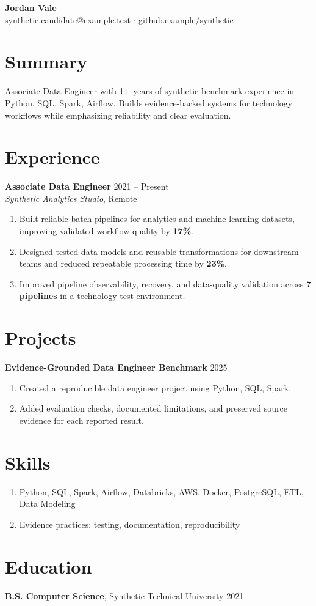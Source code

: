 \documentclass[10pt,letterpaper]{article}
\begin{document}
\begin{center}
{\Large \textbf{Jordan Vale}}\\
synthetic.candidate@example.test $\cdot$ github.example/synthetic
\end{center}

\section*{Summary}
Associate Data Engineer with 1+ years of synthetic benchmark experience in Python, SQL, Spark, Airflow. Builds evidence-backed systems for technology workflows while emphasizing reliability and clear evaluation.

\section*{Experience}
\textbf{Associate Data Engineer} \hfill 2021 -- Present\\
\textit{Synthetic Analytics Studio}, Remote
\begin{enumerate}
  \item Built reliable batch pipelines for analytics and machine learning datasets, improving validated workflow quality by \textbf{17\%}.
  \item Designed tested data models and reusable transformations for downstream teams and reduced repeatable processing time by \textbf{23\%}.
  \item Improved pipeline observability, recovery, and data-quality validation across \textbf{7 pipelines} in a technology test environment.
\end{enumerate}

\section*{Projects}
\textbf{Evidence-Grounded Data Engineer Benchmark} \hfill 2025
\begin{enumerate}
  \item Created a reproducible data engineer project using Python, SQL, Spark.
  \item Added evaluation checks, documented limitations, and preserved source evidence for each reported result.
\end{enumerate}

\section*{Skills}
\begin{enumerate}
  \item Python, SQL, Spark, Airflow, Databricks, AWS, Docker, PostgreSQL, ETL, Data Modeling
  \item Evidence practices: testing, documentation, reproducibility
\end{enumerate}

\section*{Education}
\textbf{B.S. Computer Science}, Synthetic Technical University \hfill 2021
\end{document}
